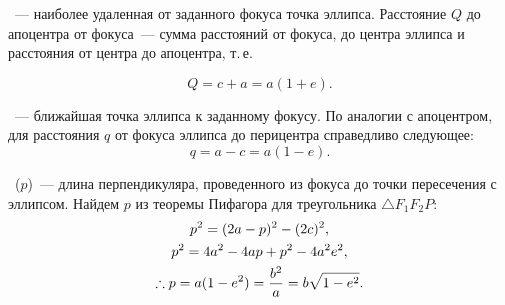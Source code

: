 ~--- наиболее удаленная от заданного фокуса точка эллипса. Расстояние $Q$ до апоцентра от фокуса~--- сумма расстояний от фокуса, до центра эллипса и расстояния от центра до апоцентра, т.\,е.

\begin{equation}
	Q = c + a = a (1 + e).
\end{equation}

~--- ближайшая точка эллипса к заданному фокусу. По аналогии с апоцентром, для расстояния $q$ от фокуса эллипса до перицентра справедливо следующее:
\begin{equation}
	q = a - c = a (1 - e).
\end{equation}

~($p$)~--- длина перпендикуляра, проведенного из фокуса до точки пересечения с эллипсом. Найдем $p$ из теоремы Пифагора для треугольника $\triangle F_1 F_2 P$:
\begin{gather}
	p^2 = (2a - p)^2 - (2c)^2, \notag\\
	p^2 =  4a^2 - 4ap + p^2 - 4a^2e^2,\notag\\
	\therefore p = a (1 - e^2) = \frac{b^2}{a} = b \sqrt{1 - e^2}.
\end{gather}


